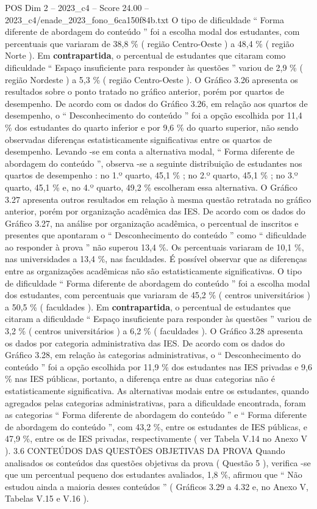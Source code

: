 \begin{textsample}{POS Dim 2 – 2023\_c4 – Score 24.00 – 2023\_c4/enade\_2023\_fono\_6ca150f84b.txt}
O tipo de dificuldade “ Forma diferente de abordagem do conteúdo ” foi a escolha modal dos estudantes, com percentuais que variaram de 38,8 \% ( região Centro-Oeste ) a 48,4 \% ( região Norte ).
Em \textbf{contrapartida}, o percentual de estudantes que citaram como dificuldade “ Espaço insuficiente para responder às questões ” variou de 2,9 \% ( região Nordeste ) a 5,3 \% ( região Centro-Oeste ).
O Gráfico 3.26 apresenta os resultados sobre o ponto tratado no gráfico anterior, porém por quartos de desempenho.
De acordo com os dados do Gráfico 3.26, em relação aos quartos de desempenho, o “ Desconhecimento do conteúdo ” foi a opção escolhida por 11,4 \% dos estudantes do quarto inferior e por 9,6 \% do quarto superior, não sendo observadas diferenças estatisticamente significativas entre os quartos de desempenho.
Levando -se em conta a alternativa modal, “ Forma diferente de abordagem do conteúdo ”, observa -se a seguinte distribuição de estudantes nos quartos de desempenho : no 1.º quarto, 45,1 \% ; no 2.º quarto, 45,1 \% ; no 3.º quarto, 45,1 \% e, no 4.º quarto, 49,2 \% escolheram essa alternativa.
O Gráfico 3.27 apresenta outros resultados em relação à mesma questão retratada no gráfico anterior, porém por organização acadêmica das IES.
De acordo com os dados do Gráfico 3.27, na análise por organização acadêmica, o percentual de inscritos e presentes que apontaram o “ Desconhecimento do conteúdo ” como “ dificuldade ao responder à prova ” não superou 13,4 \%.
Os percentuais variaram de 10,1 \%, nas universidades a 13,4 \%, nas faculdades.
É possível observar que as diferenças entre as organizações acadêmicas não são estatisticamente significativas.
O tipo de dificuldade “ Forma diferente de abordagem do conteúdo ” foi a escolha modal dos estudantes, com percentuais que variaram de 45,2 \% ( centros universitários ) a 50,5 \% ( faculdades ).
Em \textbf{contrapartida}, o percentual de estudantes que citaram a dificuldade “ Espaço insuficiente para responder às questões ” variou de 3,2 \% ( centros universitários ) a 6,2 \% ( faculdades ).
O Gráfico 3.28 apresenta os dados por categoria administrativa das IES.
De acordo com os dados do Gráfico 3.28, em relação às categorias administrativas, o “ Desconhecimento do conteúdo ” foi a opção escolhida por 11,9 \% dos estudantes nas IES privadas e 9,6 \% nas IES públicas, portanto, a diferença entre as duas categorias não é estatisticamente significativa.
As alternativas modais entre os estudantes, quando agregados pelas categorias administrativas, para a dificuldade encontrada, foram as categorias “ Forma diferente de abordagem do conteúdo ” e “ Forma diferente de abordagem do conteúdo ”, com 43,2 \%, entre os estudantes de IES públicas, e 47,9 \%, entre os de IES privadas, respectivamente ( ver Tabela V.14 no Anexo V ). 3.6 CONTEÚDOS DAS QUESTÕES OBJETIVAS DA PROVA Quando analisados os conteúdos das questões objetivas da prova ( Questão 5 ), verifica -se que um percentual pequeno dos estudantes avaliados, 1,8 \%, afirmou que “ Não estudou ainda a maioria desses conteúdos ” ( Gráficos 3.29 a 4.32 e, no Anexo V, Tabelas V.15 e V.16 ).

\end{textsample}
